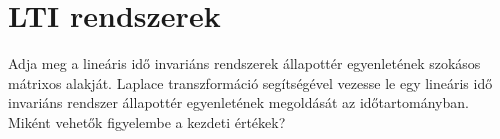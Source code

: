 \documentclass[../main.tex]{subfiles}
\begin{document}
\section{LTI rendszerek}

\begin{fulltheorem}
	Adja meg a lineáris idő invariáns rendszerek állapottér egyenletének
	szokásos mátrixos alakját. Laplace transzformáció segítségével vezesse le
	egy lineáris idő invariáns rendszer állapottér egyenletének megoldását az
	időtartományban. Miként vehetők figyelembe a kezdeti értékek?
\end{fulltheorem}
\end{document}
